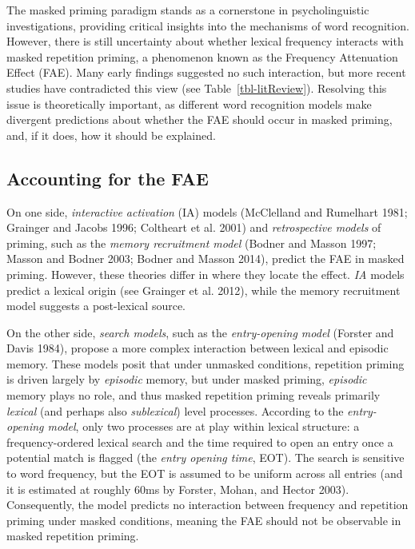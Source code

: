 \documentclass[
]{interact}
\begin{document}
The masked priming paradigm stands as a cornerstone in psycholinguistic
investigations, providing critical insights into the mechanisms of word
recognition. However, there is still uncertainty about whether lexical
frequency interacts with masked repetition priming, a phenomenon known
as the Frequency Attenuation Effect (FAE). Many early findings suggested
no such interaction, but more recent studies have contradicted this view
(see Table~\ref{tbl-litReview}). Resolving this issue is theoretically
important, as different word recognition models make divergent
predictions about whether the FAE should occur in masked priming, and,
if it does, how it should be explained.

\subsection{Accounting for the FAE}\label{accounting-for-the-fae}

On one side, \emph{interactive activation} (IA) models (McClelland and
Rumelhart 1981; Grainger and Jacobs 1996; Coltheart et al. 2001) and
\emph{retrospective models} of priming, such as the \emph{memory
recruitment model} (Bodner and Masson 1997; Masson and Bodner 2003;
Bodner and Masson 2014), predict the FAE in masked priming. However,
these theories differ in where they locate the effect. \emph{IA} models
predict a lexical origin (see Grainger et al. 2012), while the memory
recruitment model suggests a post-lexical source.

On the other side, \emph{search models}, such as the \emph{entry-opening
model} (Forster and Davis 1984), propose a more complex interaction
between lexical and episodic memory. These models posit that under
unmasked conditions, repetition priming is driven largely by
\emph{episodic} memory, but under masked priming, \emph{episodic} memory
plays no role, and thus masked repetition priming reveals primarily
\emph{lexical} (and perhaps also \emph{sublexical}) level processes.
According to the \emph{entry-opening model}, only two processes are at
play within lexical structure: a frequency-ordered lexical search and
the time required to open an entry once a potential match is flagged
(the \emph{entry opening time}, EOT). The search is sensitive to word
frequency, but the EOT is assumed to be uniform across all entries (and
it is estimated at roughly 60ms by Forster, Mohan, and Hector 2003).
Consequently, the model predicts no interaction between frequency and
repetition priming under masked conditions, meaning the FAE should not
be observable in masked repetition priming.
\end{document}
